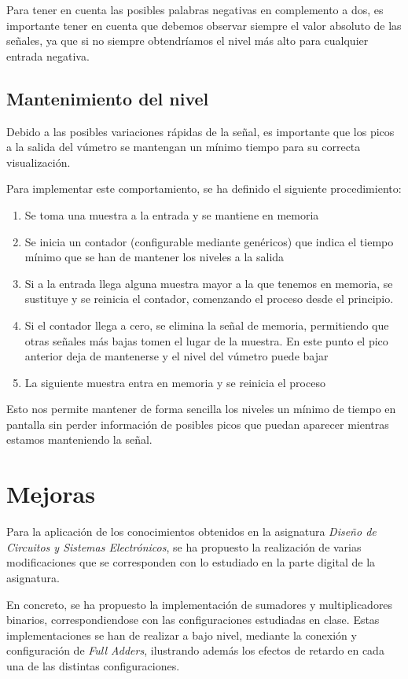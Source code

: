 \documentclass[a4paper,12pt]{article}
\begin{document}
Para tener en cuenta las posibles palabras negativas en complemento a dos, es importante tener en cuenta que debemos observar siempre el valor absoluto de las señales, ya que si no siempre obtendríamos el nivel más alto para cualquier entrada negativa.

\subsection{Mantenimiento del nivel}
Debido a las posibles variaciones rápidas de la señal, es importante que los picos a la salida del vúmetro se mantengan un mínimo tiempo para su correcta visualización.

Para implementar este comportamiento, se ha definido el siguiente procedimiento:
\begin{enumerate}
\item Se toma una muestra a la entrada y se mantiene en memoria
\item Se inicia un contador (configurable mediante genéricos) que indica el tiempo mínimo que se han de mantener los niveles a la salida
\item Si a la entrada llega alguna muestra mayor a la que tenemos en memoria, se sustituye y se reinicia el contador, comenzando el proceso desde el principio.
\item Si el contador llega a cero, se elimina la señal de memoria, permitiendo que otras señales más bajas tomen el lugar de la muestra. En este punto el pico anterior deja de mantenerse y el nivel del vúmetro puede bajar
\item La siguiente muestra entra en memoria y se reinicia el proceso
\end{enumerate}

Esto nos permite mantener de forma sencilla los niveles un mínimo de tiempo en pantalla sin perder información de posibles picos que puedan aparecer mientras estamos manteniendo la señal.

\section{Mejoras}
Para la aplicación de los conocimientos obtenidos en la asignatura \emph{Diseño de Circuitos y Sistemas Electrónicos}, se ha propuesto la realización de varias modificaciones que se corresponden con lo estudiado en la parte digital de la asignatura.

En concreto, se ha propuesto la implementación de sumadores y multiplicadores binarios, correspondiendose con las configuraciones estudiadas en clase. Estas implementaciones se han de realizar a bajo nivel, mediante la conexión y configuración de \emph{Full Adders}, ilustrando además los efectos de retardo en cada una de las distintas configuraciones.
\end{document}
